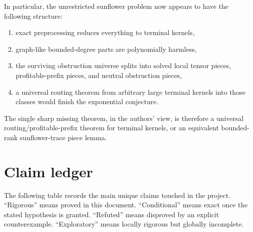 \documentclass[11pt]{article}
\theoremstyle{definition}
\newcommand{\1}{\mathbf{1}}
\begin{document}
In particular, the unrestricted sunflower problem now appears to have the following structure:
\begin{enumerate}[label=(\roman*),leftmargin=2.2em]
\item exact preprocessing reduces everything to terminal kernels,
\item graph-like bounded-degree parts are polynomially harmless,
\item the surviving obstruction universe splits into solved local tensor pieces, profitable-prefix pieces, and neutral obstruction pieces,
\item a universal routing theorem from arbitrary large terminal kernels into those classes would finish the exponential conjecture.
\end{enumerate}

The single sharp missing theorem, in the authors' view, is therefore a universal routing/profitable-prefix theorem for terminal kernels, or an equivalent bounded-rank sunflower-trace piece lemma.

\appendix

\section{Claim ledger}\label{app:ledger}
The following table records the main unique claims touched in the project. ``Rigorous'' means proved in this document. ``Conditional'' means exact once the stated hypothesis is granted. ``Refuted'' means disproved by an explicit counterexample. ``Exploratory'' means locally rigorous but globally incomplete.
\end{document}
